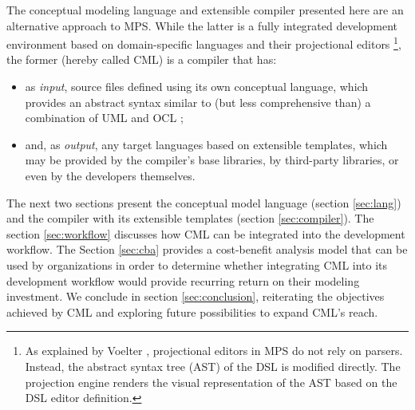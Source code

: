 The conceptual modeling language and extensible compiler presented here are an alternative approach to MPS.
While the latter is a fully integrated development environment based on domain-specific languages and their projectional editors \footnote{As explained by Voelter \cite{voelter}, projectional editors in MPS do not rely on parsers. Instead, the abstract syntax tree (AST) of the DSL is modified directly. The projection engine renders the visual representation of the AST based on the DSL editor definition.}, the former (hereby called CML) is a compiler that has:
\begin{itemize}
\item as \emph{input}, source files defined using its own conceptual language, which provides an abstract syntax similar to (but less comprehensive than) a combination of UML \cite{uml} and OCL \cite{ocl}; 
\item and, as \emph{output}, any target languages based on extensible templates, which may be provided by the compiler's base libraries, by third-party libraries, or even by the developers themselves.
\end{itemize}

The next two sections present the conceptual model language (section \ref{sec:lang}) and the compiler with its extensible templates (section \ref{sec:compiler}). The section \ref{sec:workflow} discusses how CML can be integrated into the development workflow. The Section \ref{sec:cba} provides a cost-benefit analysis model that can be used by organizations in order to determine whether integrating CML into its development workflow would provide recurring return on their modeling investment. We conclude in section \ref{sec:conclusion}, reiterating the objectives achieved by CML and exploring future possibilities to expand CML's reach.
